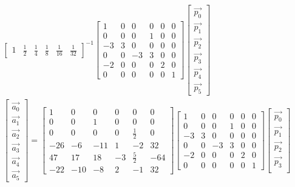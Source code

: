 \documentclass{letter}
\begin{document}
\begin{align*}
\begin{bmatrix}
1 & \frac{1}{2} & \frac{1}{4} & \frac{1}{8} & \frac{1}{16} & \frac{1}{32} 
\end{bmatrix}^{-1}
\begin{bmatrix}
1 & 0 & 0 & 0 & 0 & 0 \\
0 & 0 & 0 & 1 & 0 & 0 \\
-3 & 3 & 0 & 0 & 0 & 0 \\
0 & 0 & -3 & 3 & 0 & 0 \\
-2 & 0 & 0 & 0 & 2 & 0 \\
0 & 0 & 0 & 0 & 0 & 1
\end{bmatrix}
\begin{bmatrix}
\vec{p_0} \\
\vec{p_1} \\
\vec{p_2} \\
\vec{p_3} \\
\vec{p_4} \\
\vec{p_5} 
\end{bmatrix}
\\
\begin{bmatrix}
\vec{a_0} \\
\vec{a_1} \\
\vec{a_2} \\
\vec{a_3} \\
\vec{a_4} \\
\vec{a_5} 
\end{bmatrix}
=
\begin{bmatrix}
1 & 0 & 0 & 0 & 0 & 0 \\
0 & 0 & 1 & 0 & 0 & 0 \\
0 & 0 & 0 & 0 & \frac{1}{2} & 0 \\
-26 & -6 & -11 & 1 & -2 & 32 \\
47 & 17 & 18 & -3 & \frac{5}{2} & -64 \\
-22 & -10 & -8 & 2 & -1 & 32
\end{bmatrix}
\begin{bmatrix}
1 & 0 & 0 & 0 & 0 & 0 \\
0 & 0 & 0 & 1 & 0 & 0 \\
-3 & 3 & 0 & 0 & 0 & 0 \\
0 & 0 & -3 & 3 & 0 & 0 \\
-2 & 0 & 0 & 0 & 2 & 0 \\
0 & 0 & 0 & 0 & 0 & 1
\end{bmatrix}
\begin{bmatrix}
\vec{p_0} \\
\vec{p_1} \\
\vec{p_2} \\
\vec{p_3} \\

\end{bmatrix}
\end{align*}
\end{document}

